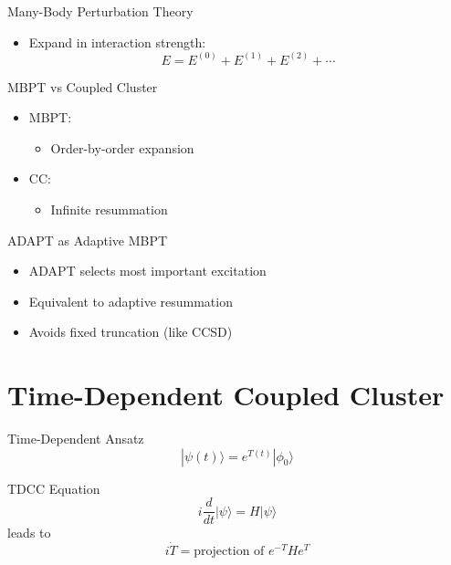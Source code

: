 \documentclass{beamer}
\begin{document}
\begin{frame}{Many-Body Perturbation Theory}
\begin{itemize}
\item Expand in interaction strength:
\[
E = E^{(0)} + E^{(1)} + E^{(2)} + \cdots
\]
\end{itemize}
\end{frame}


\begin{frame}{MBPT vs Coupled Cluster}
\begin{itemize}
\item MBPT:
\begin{itemize}
\item Order-by-order expansion
\end{itemize}
\item CC:
\begin{itemize}
\item Infinite resummation
\end{itemize}
\end{itemize}
\end{frame}


\begin{frame}{ADAPT as Adaptive MBPT}
\begin{itemize}
\item ADAPT selects most important excitation
\item Equivalent to adaptive resummation
\item Avoids fixed truncation (like CCSD)
\end{itemize}
\end{frame}

\section{Time-Dependent Coupled Cluster}

\begin{frame}{Time-Dependent Ansatz}
\[
|\psi(t)\rangle = e^{T(t)} |\phi_0\rangle
\]
\end{frame}


\begin{frame}{TDCC Equation}
\[
i \frac{d}{dt}|\psi\rangle = H |\psi\rangle
\]
leads to
\[
i \dot{T} = \text{projection of } e^{-T}He^T
\]
\end{frame}
\end{document}
